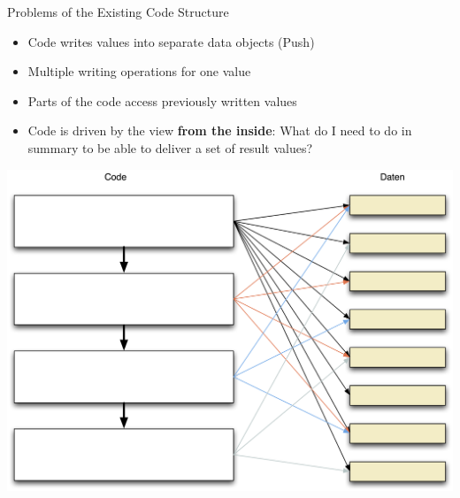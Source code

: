 \begin{frame}[fragile]{Problems of the Existing Code Structure}
\begin{minipage}{.45\paperwidth}
\begin{itemize}
\item Code writes values into separate data objects (\glqq Push\grqq{})
\item Multiple writing operations for one value
\item Parts of  the code access previously written values
\item Code is driven by the view \textbf{from the inside}: What do I need to do in summary to be able to deliver a set of result values?
\end{itemize}
\end{minipage} \hfill
\begin{minipage}{.45\paperwidth}
\includegraphics[width=\textwidth]{Codestruktur.png}
\end{minipage}

\end{frame}

